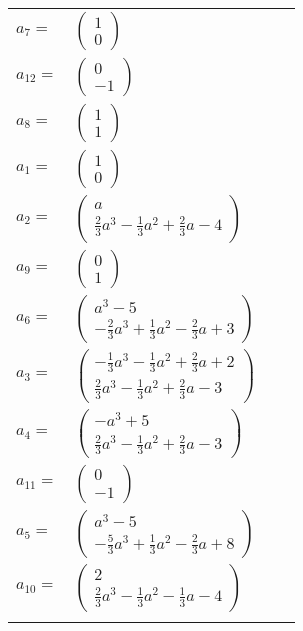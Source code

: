 \documentclass[1p]{elsarticle_modified}
\theoremstyle{definition}
\begin{document}
\begin{tabular}{m{7pt} m{180pt} m{7pt} m{180pt} }
\flushright $a_{7}=$&$\begin{pmatrix}1\\0\end{pmatrix}$ \\
\flushright $a_{12}=$&$\begin{pmatrix}0\\-1\end{pmatrix}$ \\
\flushright $a_{8}=$&$\begin{pmatrix}1\\1\end{pmatrix}$ \\
\flushright $a_{1}=$&$\begin{pmatrix}1\\0\end{pmatrix}$ \\
\flushright $a_{2}=$&$\begin{pmatrix}a\\\frac{2}{3} a^3-\frac{1}{3} a^2+\frac{2}{3} a-4\end{pmatrix}$ \\
\flushright $a_{9}=$&$\begin{pmatrix}0\\1\end{pmatrix}$ \\
\flushright $a_{6}=$&$\begin{pmatrix}a^3-5\\-\frac{2}{3} a^3+\frac{1}{3} a^2-\frac{2}{3} a+3\end{pmatrix}$ \\
\flushright $a_{3}=$&$\begin{pmatrix}-\frac{1}{3} a^3-\frac{1}{3} a^2+\frac{2}{3} a+2\\\frac{2}{3} a^3-\frac{1}{3} a^2+\frac{2}{3} a-3\end{pmatrix}$ \\
\flushright $a_{4}=$&$\begin{pmatrix}- a^3+5\\\frac{2}{3} a^3-\frac{1}{3} a^2+\frac{2}{3} a-3\end{pmatrix}$ \\
\flushright $a_{11}=$&$\begin{pmatrix}0\\-1\end{pmatrix}$ \\
\flushright $a_{5}=$&$\begin{pmatrix}a^3-5\\-\frac{5}{3} a^3+\frac{1}{3} a^2-\frac{2}{3} a+8\end{pmatrix}$ \\
\flushright $a_{10}=$&$\begin{pmatrix}2\\\frac{2}{3} a^3-\frac{1}{3} a^2-\frac{1}{3} a-4\end{pmatrix}$\\&\end{tabular}
\end{document}
